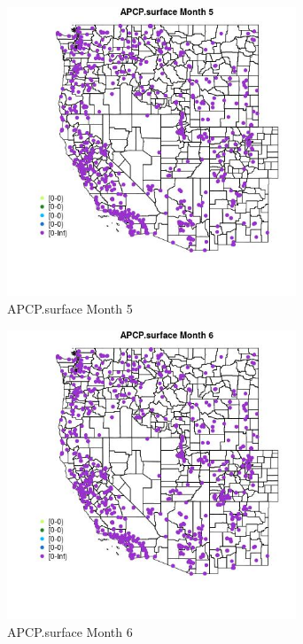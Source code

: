 \begin{figure} 
\centering  
\includegraphics[width=0.77\textwidth]{Code_Outputs/Report_ML_input_PM25_Step4_part_e_de_duplicated_aves_compiled_2019-05-21wNAs_MapObsMo5APCPsurface.jpg} 
\caption{\label{fig:Report_ML_input_PM25_Step4_part_e_de_duplicated_aves_compiled_2019-05-21wNAsMapObsMo5APCPsurface}APCP.surface Month 5} 
\end{figure} 
 

\begin{figure} 
\centering  
\includegraphics[width=0.77\textwidth]{Code_Outputs/Report_ML_input_PM25_Step4_part_e_de_duplicated_aves_compiled_2019-05-21wNAs_MapObsMo6APCPsurface.jpg} 
\caption{\label{fig:Report_ML_input_PM25_Step4_part_e_de_duplicated_aves_compiled_2019-05-21wNAsMapObsMo6APCPsurface}APCP.surface Month 6} 
\end{figure} 
 

